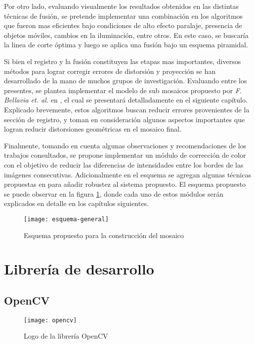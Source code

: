 Por otro lado, evaluando visualmente los resultados obtenidos en las distintas técnicas de fusión, se pretende implementar una combinación en los algoritmos que fueron mas eficientes bajo condiciones de alto efecto paralaje, presencia de objetos móviles, cambios en la iluminación, entre otros. En este caso, se buscaría la linea de corte óptima y luego se aplica una fusión bajo un esquema piramidal.

Si bien el registro y la fusión constituyen las etapas mas importantes, diversos métodos para lograr corregir errores de distorsión y proyección se han desarrollado de la mano de muchos grupos de investigación. Evaluando entre los presentes, se plantea implementar el modelo de sub mosaicos propuesto por \textit{F. Bellavia et. al.} en \cite{bellavia-ransac,bellavia-ref}, el cual se presentará detalladamente en el siguiente capítulo. Explicado brevemente, estos algoritmos buscan reducir errores provenientes de la sección de registro, y toman en consideración algunos aspectos importantes que logran reducir distorsiones geométricas en el mosaico final. 

Finalmente, tomando en cuenta algunas observaciones y recomendaciones de los trabajos consultados, se propone implementar un módulo de corrección de color con el objetivo de reducir las diferencias de intensidades entre los bordes de las imágenes consecutivas. Adicionalmente en el esquema se agregan algunas técnicas propuestas en \cite{grid} para añadir robustez al sistema propuesto. El esquema propuesto se puede observar en la figura \ref{imagen:esquema}, donde cada uno de estos módulos serán explicados en detalle en los capítulos siguientes.

\begin{figure}[H]
	\centerline{
		\texttt{[image: esquema-general]}}
		\caption{Esquema propuesto para la construcción del mosaico}
	\label{imagen:esquema}
\end{figure}

\section{Librería de desarrollo}

\subsection{OpenCV}

\begin{wrapfigure}{R}{5cm}
	\begin{center}
		\vspace*{-0.2in}
		\texttt{[image: opencv]}
	\end{center}
	\caption{Logo de la librería OpenCV}
\end{wrapfigure}

